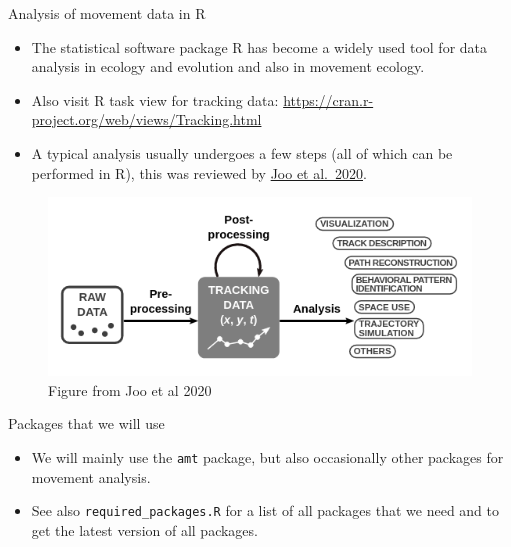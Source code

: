\documentclass[ignorenonframetext,,t]{beamer}
\providecommand{\tightlist}{%
\setlength{\itemsep}{0pt}\setlength{\parskip}{0pt}}
\providecommand{\tightlist}{%
\setlength{\itemsep}{0pt}\setlength{\parskip}{0pt}}
\renewcommand{\tightlist}{\setlength{\itemsep}{1.4ex}\setlength{\parskip}{0pt}}
\begin{document}
\begin{frame}{Analysis of movement data in R}
\label{analysis-of-movement-data-in-r}
\begin{itemize}
\tightlist
\item
  The statistical software package R has become a widely used tool for
  data analysis in ecology and evolution and also in movement ecology.
\item
  Also visit R task view for tracking data:
  \url{https://cran.r-project.org/web/views/Tracking.html}
\end{itemize}
\end{frame}

\begin{frame}
\begin{itemize}
\tightlist
\item
  A typical analysis usually undergoes a few steps (all of which can be
  performed in R), this was reviewed by
  \href{https://besjournals.onlinelibrary.wiley.com/doi/full/10.1111/1365-2656.13116}{Joo
  et al.~2020}.
\end{itemize}

\begin{figure}

{\centering \includegraphics[width=0.95\linewidth]{img/joo2020} 

}

\caption{Figure from Joo et al 2020}\label{fig:unnamed-chunk-1}
\end{figure}
\end{frame}

\begin{frame}[fragile]
\begin{block}{Packages that we will use}
\label{packages-that-we-will-use}
\begin{itemize}
\item
  We will mainly use the \texttt{amt} package, but also occasionally
  other packages for movement analysis.
\item
  See also \texttt{required\_packages.R} for a list of all packages that
  we need and to get the latest version of all packages.
\end{itemize}
\end{block}
\end{frame}
\end{document}
